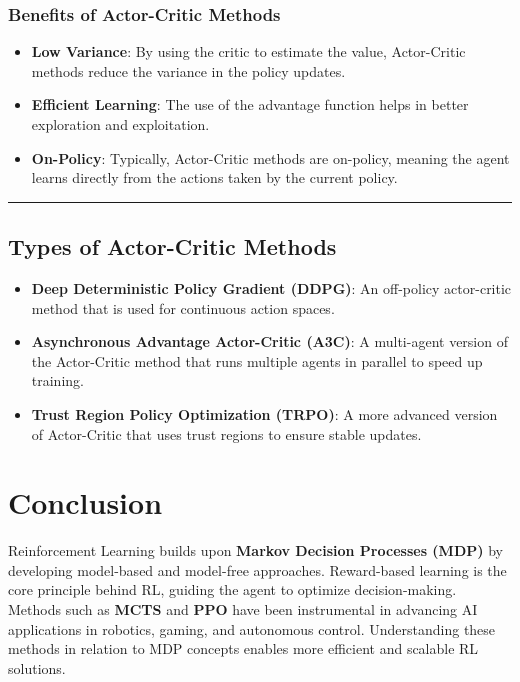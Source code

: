 \documentclass[
]{book}
\providecommand{\tightlist}{%
  \setlength{\itemsep}{0pt}\setlength{\parskip}{0pt}}
\begin{document}
\subsection{Benefits of Actor-Critic Methods}\label{benefits-of-actor-critic-methods}

\begin{itemize}
\tightlist
\item
  \textbf{Low Variance}: By using the critic to estimate the value, Actor-Critic methods reduce the variance in the policy updates.
\item
  \textbf{Efficient Learning}: The use of the advantage function helps in better exploration and exploitation.
\item
  \textbf{On-Policy}: Typically, Actor-Critic methods are on-policy, meaning the agent learns directly from the actions taken by the current policy.
\end{itemize}

\begin{center}\rule{0.5\linewidth}{0.5pt}\end{center}

\section{Types of Actor-Critic Methods}\label{types-of-actor-critic-methods}

\begin{itemize}
\tightlist
\item
  \textbf{Deep Deterministic Policy Gradient (DDPG)}: An off-policy actor-critic method that is used for continuous action spaces.
\item
  \textbf{Asynchronous Advantage Actor-Critic (A3C)}: A multi-agent version of the Actor-Critic method that runs multiple agents in parallel to speed up training.
\item
  \textbf{Trust Region Policy Optimization (TRPO)}: A more advanced version of Actor-Critic that uses trust regions to ensure stable updates.
\end{itemize}

\chapter{\texorpdfstring{\textbf{Conclusion}}{Conclusion}}\label{conclusion-3}

Reinforcement Learning builds upon \textbf{Markov Decision Processes (MDP)} by developing model-based and model-free approaches. Reward-based learning is the core principle behind RL, guiding the agent to optimize decision-making. Methods such as \textbf{MCTS} and \textbf{PPO} have been instrumental in advancing AI applications in robotics, gaming, and autonomous control. Understanding these methods in relation to MDP concepts enables more efficient and scalable RL solutions.
\end{document}
